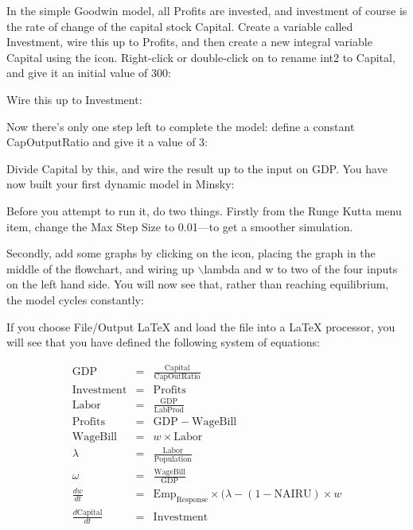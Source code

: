 In the simple Goodwin model, all Profits are invested, and investment
of course is the rate of change of the capital stock Capital. Create a
variable called Investment, wire this up to Profits, and then create a
new integral variable Capital using the 
icon. Right-click or double-click on to rename int2 to Capital, and
give it an initial value of 300: 


Wire this up to Investment:


Now there's only one step left to complete the model: define a
constant CapOutputRatio and give it a value of 3:



Divide Capital by this, and wire the result up to the input on
GDP. You have now built your first dynamic model in Minsky: 


Before you attempt to run it, do two things. Firstly from the Runge
Kutta menu item, change the Max Step Size to 0.01---to get a smoother
simulation. 


Secondly, add some graphs by clicking on the
 icon, placing the graph
in the middle of the flowchart, and wiring up $\backslash$lambda and w to two of
the four inputs on the left hand side. You will now see that, rather
than reaching equilibrium, the model cycles constantly:


If you choose File/Output LaTeX and load the file into a LaTeX
processor, you will see that you have defined the following system of
equations:

\begin{eqnarray*}
\mathrm{GDP}&=&\frac{\mathrm{Capital}}{\mathrm{CapOutRatio}}\\
\mathrm{Investment}&=&\mathrm{Profits}\\
\mathrm{Labor}&=&\frac{\mathrm{GDP}}{\mathrm{LabProd}}\\
\mathrm{Profits}&=&\mathrm{GDP}-\mathrm{WageBill}\\
\mathrm{WageBill}&=&w\times\mathrm{Labor}\\
\lambda&=&\frac{\mathrm{Labor}}{\mathrm{Population}}\\
\omega&=&\frac{\mathrm{WageBill}}{\mathrm{GDP}}\\
\frac{dw}{dt}&=&\mathrm{Emp}_\mathrm{Response}\times(\lambda-(1-\mathrm{NAIRU})
        \times w\\
\frac{d\mathrm{Capital}}{dt}&=&\mathrm{Investment}\\
\end{eqnarray*}


